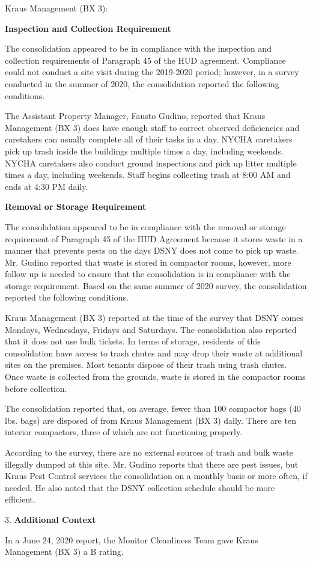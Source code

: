 Kraus Management (BX 3):

\textbf{Inspection and Collection Requirement}

The consolidation appeared to be in compliance with the inspection and collection requirements of Paragraph 45 of the HUD agreement. Compliance could not conduct a site visit during the 2019-2020 period; however, in a survey conducted in the summer of 2020, the consolidation reported the following conditions.

The Assistant Property Manager, Fausto Gudino, reported that Kraus Management (BX 3) does have enough staff to correct observed deficiencies and caretakers can usually complete all of their tasks in a day. NYCHA caretakers pick up trash inside the buildings multiple times a day, including weekends. NYCHA caretakers also conduct ground inspections and pick up litter multiple times a day, including weekends. Staff begins collecting trash at 8:00 AM and ends at 4:30 PM daily. 

\textbf{Removal or Storage Requirement}

The consolidation appeared to be in compliance with the  removal or storage requirement of Paragraph  45 of the HUD Agreement because it stores waste in a manner that prevents pests on the days DSNY does not come to pick up waste. Mr. Gudino reported that waste is stored in compactor rooms, however, more follow up is needed to ensure that the consolidation is in compliance with the storage requirement. Based on the same summer of  2020 survey, the consolidation reported the following conditions.

Kraus Management (BX 3) reported at the time of the survey that DSNY comes Mondays, Wednesdays, Fridays and Saturdays. The consolidation also reported that it does not use bulk tickets. In terms of storage, residents of this consolidation have access to trash chutes and may drop their waste at additional sites on the premises. Most tenants dispose of their trash using trash chutes. Once waste is collected from the grounds, waste is stored in the compactor rooms before collection. 

The consolidation reported that, on average, fewer than 100 compactor bags (40 lbs. bags) are disposed of from Kraus Management (BX 3) daily. There are ten interior compactors, three of which are not functioning properly. 

According to the survey, there are no external sources of trash and bulk waste illegally dumped at this site. Mr. Gudino reports that there are pest issues, but Kraus Pest Control services the consolidation on a monthly basis or more often, if needed. He also noted that the DSNY collection schedule should be more efficient. 

3. \textbf{Additional Context} 

In a June 24, 2020 report, the Monitor Cleanliness Team gave Kraus Management (BX 3) a B rating. 